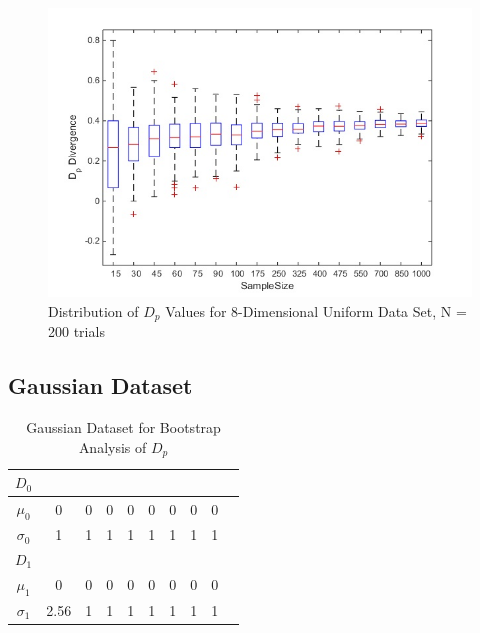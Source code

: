 \documentclass{article}
\begin{document}
	\begin{figure}[h!]
		\caption{Distribution of $D_p$ Values for 8-Dimensional Uniform Data Set, N = 200 trials}
		\centering
		\includegraphics[scale=0.6]{dp_n200_uniform_bars}
	\end{figure}	
\newpage
	\subsection{\small Gaussian Dataset}
	
	
	\begin{table}[!h]
		\caption{Gaussian Dataset for Bootstrap Analysis of $D_p$}
		\centering %
		\begin{tabular}{c c c c c c c c c c} %
			$D_0$ &  &  &  \\ [0.5ex] %
			\hline %
			$\mu_0$ & 0 & 0 & 0 & 0 & 0 & 0 & 0 & 0\\[0.5ex] %
			$\sigma_0$ & 1 & 1 & 1 & 1 & 1 & 1 & 1 & 1\\[0.5ex]
			
			$D_1$ & \\ [0.5ex]
			
			\hline
			$\mu_1$ & 0 & 0 & 0 & 0 & 0 & 0 & 0 & 0\\[0.5ex] %
			$\sigma_1$ & 2.56 & 1 & 1 & 1 & 1 & 1 & 1 & 1\\[0.5ex]
			\hline %
		\end{tabular}
		\label{table:nonlin} %
	\end{table}
	
\end{document}
